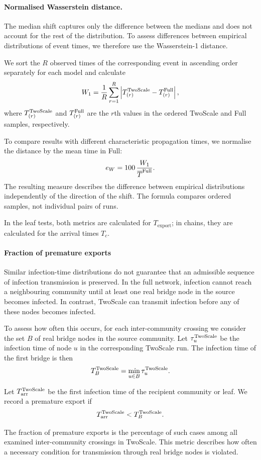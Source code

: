 \documentclass{ieeeaccess}
\newcommand{\Full}{\textup{Full}}
\newcommand{\TS}{\textup{TwoScale}}
\newcommand{\eW}{e_{W}}
\begin{document}
\paragraph{Normalised Wasserstein distance.}
The median shift captures only the difference between the medians and does not account for the rest of the distribution. To assess differences between empirical distributions of event times, we therefore use the Wasserstein-1 distance.

We sort the $R$ observed times of the corresponding event in ascending order separately for each model and calculate
\[
W_1 =
\frac{1}{R}
\sum_{r=1}^{R}
\left|
T_{(r)}^{\TS}-T_{(r)}^{\Full}
\right|,
\]
where $T_{(r)}^{\TS}$ and $T_{(r)}^{\Full}$ are the $r$th values in the ordered \TS{} and \Full{} samples, respectively.

To compare results with different characteristic propagation times, we normalise the distance by the mean time in \Full{}:
\[
\eW =
100\,\frac{W_1}{\overline{T}^{\Full}}.
\]
The resulting measure describes the difference between empirical distributions independently of the direction of the shift. The formula compares ordered samples, not individual pairs of runs.

In the leaf tests, both metrics are calculated for $T_{\mathrm{export}}$; in chains, they are calculated for the arrival times $T_c$.

\paragraph{Fraction of premature exports}
Similar infection-time distributions do not guarantee that an admissible sequence of infection transmission is preserved. In the full network, infection cannot reach a neighbouring community until at least one real bridge node in the source becomes infected. In contrast, \TS{} can transmit infection before any of these nodes becomes infected.

To assess how often this occurs, for each inter-community crossing we consider the set $B$ of real bridge nodes in the source community. Let $\tau_u^{\TS}$ be the infection time of node $u$ in the corresponding \TS{} run. The infection time of the first bridge is then
\[
T_B^{\TS}=\min_{u\in B}\tau_u^{\TS}.
\]

Let $T_{\mathrm{arr}}^{\TS}$ be the first infection time of the recipient community or leaf. We record a premature export if
\[
T_{\mathrm{arr}}^{\TS}<T_B^{\TS}.
\]

The fraction of premature exports is the percentage of such cases among all examined inter-community crossings in \TS{}. This metric describes how often a necessary condition for transmission through real bridge nodes is violated.
\end{document}
